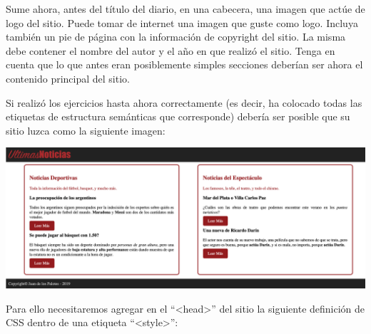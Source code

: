 \begin{exercise}
Sume ahora, antes del título del diario, en una cabecera, una imagen que
actúe de logo del sitio. Puede tomar de internet una imagen que guste
como logo. Incluya también un pie de página con la información de copyright
del sitio. La misma debe contener el nombre del autor y el año en que
realizó el sitio. Tenga en cuenta que lo que antes eran posiblemente
simples secciones deberían ser ahora el contenido principal del sitio.
\end{exercise}

\begin{exercise}
Si realizó los ejercicios hasta ahora correctamente (es decir, ha colocado
todas las etiquetas de estructura semánticas que corresponde) debería ser
posible que su sitio luzca como la siguiente imagen:

\includegraphics[scale=0.3]{anexos/1_lenguajes_marcado/2_html/imagenes/diario_4.png}

Para ello necesitaremos agregar en el ``<head>'' del sitio la siguiente
definición de CSS dentro de una etiqueta ``<style>'':


\end{exercise}
